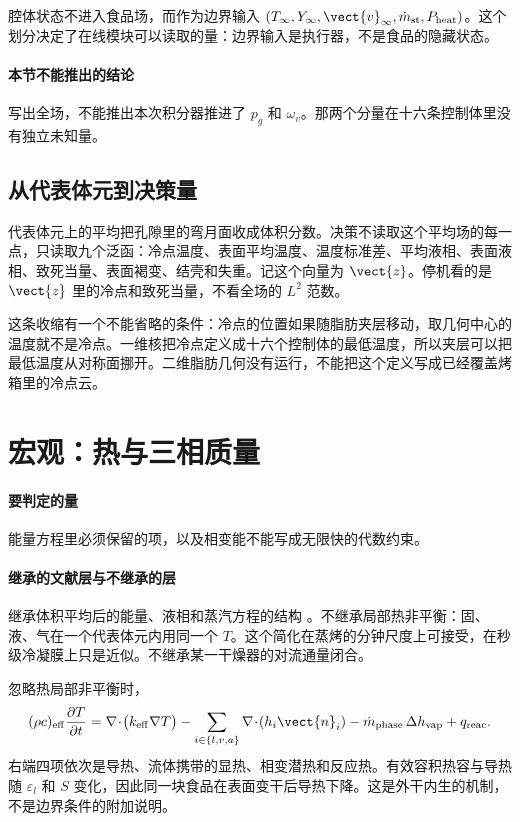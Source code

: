 腔体状态不进入食品场，而作为边界输入 \((T_\infty,Y_\infty,\vect{v}_\infty,\dot m_{\mathrm{st}},P_{\mathrm{heat}})\)。这个划分决定了在线模块可以读取的量：边界输入是执行器，不是食品的隐藏状态。

\paragraph{本节不能推出的结论}
写出全场，不能推出本次积分器推进了 \(p_g\) 和 \(\omega_v\)。那两个分量在十六条控制体里没有独立未知量。

\subsection{从代表体元到决策量}

代表体元上的平均把孔隙里的弯月面收成体积分数。决策不读取这个平均场的每一点，只读取九个泛函：冷点温度、表面平均温度、温度标准差、平均液相、表面液相、致死当量、表面褐变、结壳和失重。记这个向量为 \(\vect{z}\)。停机看的是 \(\vect{z}\) 里的冷点和致死当量，不看全场的 \(L^2\) 范数。

这条收缩有一个不能省略的条件：冷点的位置如果随脂肪夹层移动，取几何中心的温度就不是冷点。一维核把冷点定义成十六个控制体的最低温度，所以夹层可以把最低温度从对称面挪开。二维脂肪几何没有运行，不能把这个定义写成已经覆盖烤箱里的冷点云。

\section{宏观：热与三相质量}

\paragraph{要判定的量}
能量方程里必须保留的项，以及相变能不能写成无限快的代数约束。

\paragraph{继承的文献层与不继承的层}
继承体积平均后的能量、液相和蒸汽方程的结构 \cite{whitaker1977,datta2007}。不继承局部热非平衡：固、液、气在一个代表体元内用同一个 \(T\)。这个简化在蒸烤的分钟尺度上可接受，在秒级冷凝膜上只是近似。不继承某一干燥器的对流通量闭合。

忽略热局部非平衡时，
\begin{equation}
\label{eq:energy}
(\rho c)_{\mathrm{eff}}\frac{\partial T}{\partial t}
=\nabla\!\cdot\!\big(k_{\mathrm{eff}}\nabla T\big)
-\sum_{i\in\{l,v,a\}}\nabla\!\cdot\!(h_i\vect{n}_i)
-\dot m_{\mathrm{phase}}\,\Delta h_{\mathrm{vap}}
+q_{\mathrm{reac}}.
\end{equation}
右端四项依次是导热、流体携带的显热、相变潜热和反应热。有效容积热容与导热随 \(\varepsilon_l\) 和 \(S\) 变化，因此同一块食品在表面变干后导热下降。这是外干内生的机制，不是边界条件的附加说明。

